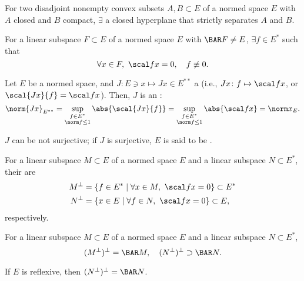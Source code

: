 For two disadjoint nonempty convex subsets $A, B \subset E$ of a normed space $E$ with $A$ closed and $B$ compact, $\exists$ a closed hyperplane that strictly separates $A$ and $B$.

For a linear subspace $F \subset E$ of a normed space $E$ with $\BAR F \neq E$, $\exists f \in E^*$ such that
\[
  \forall x \in F,\ \scal fx = 0,\quad f \not\equiv 0.
\]

Let $E$ be a normed space, and $J \colon E \ni x \mapsto Jx \in E^{**}$ a  (i.e., $Jx \colon f \mapsto \scal fx$, or $\scal{Jx}{f} = \scal fx$). Then, $J$ is an :
\[
  \norm{Jx}_{E^{**}} = \sup_{\substack{f \in E^* \\ \norm f \le 1}} \abs{\scal{Jx}{f}} = \sup_{\substack{f \in E^* \\ \norm f \le 1}} \abs{\scal fx} = \norm x_E.
\]

$J$ can be not surjective; if $J$ is surjective, $E$ is said to be .

For a linear subspace $M \subset E$ of a normed space $E$ and a linear subspace $N \subset E^*$, their  are
\begin{align*}
  M^\perp &= \{ f \in E^* \mid \forall x \in M,\ \scal fx = 0\} \subset E^* \\
  N^\perp &= \{ x \in E \mid \forall f \in N,\ \scal fx = 0\} \subset E,
\end{align*}
respectively.

For a linear subspace $M \subset E$ of a normed space $E$ and a linear subspace $N \subset E^*$,
\[
  (M^\perp)^\perp = \BAR M,\quad (N^\perp)^\perp \supset \BAR N.
\]

If $E$ is reflexive, then $(N^\perp)^\perp = \BAR N$.
